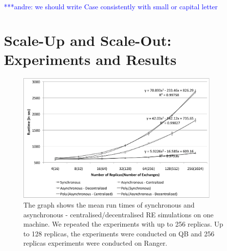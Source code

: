 \documentclass{rspublic}
\newcommand{\jhanote}[1]{ {\textcolor{red} { ***shantenu: #1 }}}
\newcommand{\alnote}[1]{ {\textcolor{blue} { ***andre: #1 }}}
\newcommand{\alnote}[1]{}
\newcommand{\jhanote}[1]{}
\begin{document}

\alnote{we should write Case consistently with small or capital letter}

\section{Scale-Up and Scale-Out: Experiments and Results}

%
\begin{figure}
\centering
\includegraphics[width=0.9\textwidth]{../data/scale_up.pdf}
\caption{\small The graph shows the mean run times of synchronous and asynchronous - centralised/decentralised RE simulations on one machine. We repeated the experiments with up to 256 replicas. Up to 128 replicas, the experiments were conducted on QB and 256 replicas experiments were conducted on Ranger.}
\label{fig:graph}
\vspace{-1em}
\end{figure}
\end{document}
